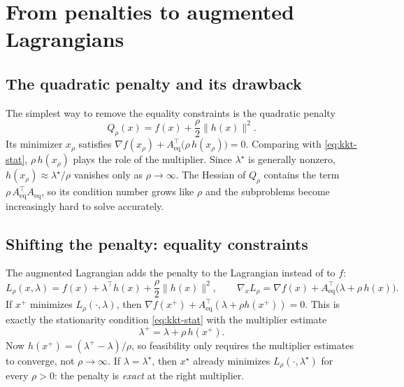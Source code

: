 \documentclass[11pt,a4paper]{article}
\newcommand{\Aeq}{A_{\mathrm{eq}}}
\newcommand{\norm}[1]{\lVert #1\rVert}
\begin{document}
\section{From penalties to augmented Lagrangians}

\subsection{The quadratic penalty and its drawback}
The simplest way to remove the equality constraints is the quadratic penalty
\[
  Q_\rho(x) = f(x) + \frac{\rho}{2}\norm{h(x)}^2 .
\]
Its minimizer $x_\rho$ satisfies $\nabla f(x_\rho) + \Aeq^\top\big(\rho\,h(x_\rho)\big) = 0$.
Comparing with \eqref{eq:kkt-stat}, $\rho\,h(x_\rho)$ plays the role of the
multiplier. Since $\lambda^\star$ is generally nonzero, $h(x_\rho)\approx\lambda^\star/\rho$
vanishes only as $\rho\to\infty$. The Hessian of $Q_\rho$ contains the term
$\rho\,\Aeq^\top\Aeq$, so its condition number grows like $\rho$ and the
subproblems become increasingly hard to solve accurately.

\subsection{Shifting the penalty: equality constraints}
The augmented Lagrangian adds the penalty to the Lagrangian instead of to $f$:
\begin{equation}\label{eq:al-eq}
  L_\rho(x,\lambda) = f(x) + \lambda^\top h(x) + \frac{\rho}{2}\norm{h(x)}^2 ,
  \qquad
  \nabla_x L_\rho = \nabla f(x) + \Aeq^\top\big(\lambda + \rho\,h(x)\big).
\end{equation}
If $x^+$ minimizes $L_\rho(\cdot,\lambda)$, then
$\nabla f(x^+) + \Aeq^\top(\lambda+\rho h(x^+)) = 0$. This is exactly the
stationarity condition \eqref{eq:kkt-stat} with the multiplier estimate
\begin{equation}\label{eq:update-eq}
  \lambda^+ = \lambda + \rho\, h(x^+).
\end{equation}
Now $h(x^+) = (\lambda^+-\lambda)/\rho$, so feasibility only requires the
multiplier estimates to converge, not $\rho\to\infty$. If $\lambda=\lambda^\star$,
then $x^\star$ already minimizes $L_\rho(\cdot,\lambda^\star)$ for every
$\rho>0$: the penalty is \emph{exact} at the right multiplier.
\end{document}
